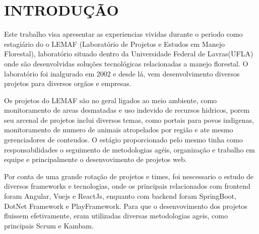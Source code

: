 \chapter{INTRODUÇÃO}

Este trabalho visa apresentar as experiencias vividas durante o periodo como estagiário do o LEMAF (Laboratório de Projetos e Estudos
em Manejo Florestal), laboratório situado dentro da Universidade Federal de Lavras(UFLA) onde são desenvolvidas soluções tecnológicas relacionadas a manejo florestal.
O laboratório foi inalgurado em 2002 e desde lá, vem desenvolvimento diversos projetos para diversos orgãos e empresas.

Os projetos do LEMAF são no geral ligados ao meio ambiente, como monitoramento de areas desmatadas e uso indevido de recursos hidricos, porem seu arcenal de projetos inclui diversos temas, como portais para povos indigenas, monitoramento de numero de animais atropelados por região e ate mesmo gerenciadores de conteudos.   
O estágio proporcionado pelo mesmo tinha como responsabilidades o seguimento de metodologias agéis, organização e trabalho em equipe e principalmente o desenvovimento de projetos web.

Por conta de uma grande rotação de projetos e times, foi nescessario o estudo de diversos frameworks e tecnologias, onde os principais relacionados com frontend foram Angular, Vuejs e ReactJs, enquanto com backend foram SpringBoot, DotNet Framework e PlayFramework.
Para que o desenvovimento dos projetos fluissem efetivamente, eram utilizadas diversas metodologias ageis, como principais Scrum e Kambam.